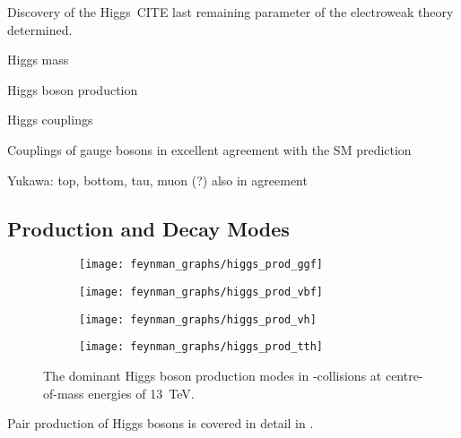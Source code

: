 Discovery of the Higgs~CITE last remaining parameter of the electroweak theory
determined.


Higgs mass

Higgs boson production

Higgs couplings


Couplings of gauge bosons in excellent agreement with the SM prediction

Yukawa: top, bottom, tau, muon (?) also in agreement


\subsection{Production and Decay Modes}


\begin{figure}[htbp]
  \centering

  \begin{subfigure}{0.45\textwidth}
    \centering
    \texttt{[image: feynman\_graphs/higgs\_prod\_ggf]}
  \end{subfigure}%
  \begin{subfigure}{0.45\textwidth}
    \centering
    \texttt{[image: feynman\_graphs/higgs\_prod\_vbf]}
  \end{subfigure}

  \vspace*{0.5em}

  \begin{subfigure}{0.45\textwidth}
    \centering
    \texttt{[image: feynman\_graphs/higgs\_prod\_vh]}
  \end{subfigure}%
  \begin{subfigure}{0.45\textwidth}
    \centering
    \texttt{[image: feynman\_graphs/higgs\_prod\_tth]}
  \end{subfigure}%

  \caption{The dominant Higgs boson production modes in \pp-collisions at
    centre-of-mass energies of \SI{13}{\TeV}.}
\end{figure}


Pair production of Higgs bosons is covered in detail in
.

